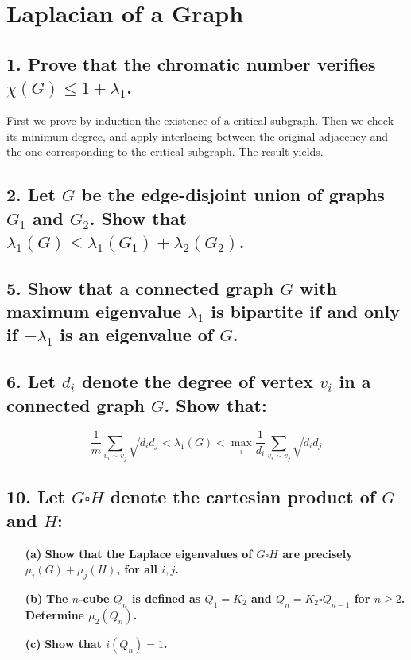 \section{Laplacian of a Graph}

\subsection[Laplacian - 1]{1. Prove that the chromatic number verifies $\chi(G) \leq 1 + \lambda_1$.}

First we prove by induction the existence of a critical subgraph.
Then we check its minimum degree, and apply interlacing between the original adjacency and the one corresponding to the critical subgraph.
The result yields.

\subsection[Laplacian - 2]{2. Let $G$ be the edge-disjoint union of graphs $G_1$ and $G_2$. Show that $\lambda_1(G) \leq \lambda_1(G_1) + \lambda_2(G_2)$.}

\subsection[Laplacian - 5]{5. Show that a connected graph $G$ with maximum eigenvalue $\lambda_1$ is bipartite if and only if $-\lambda_1$ is an eigenvalue of $G$.}

\subsection[Laplacian - 6]{6. Let $d_i$ denote the degree of vertex $v_i$ in a connected graph $G$. Show that:}
$$\frac{1}{m} \sum_{v_i \sim v_j} \sqrt{d_i d_j} < \lambda_1(G) < \max_i \frac{1}{d_i} \sum_{v_i \sim v_j} \sqrt{d_i d_j}$$

\subsection[Laplacian - 10]{10. Let $G \square H$ denote the cartesian product of $G$ and $H$:}

\begin{enumerate}
    \item[\textbf{(a)}] \textbf{Show that the Laplace eigenvalues of $G\square H$ are precisely $\mu_i(G) + \mu_j(H)$, for all $i, j$.}
    \item[\textbf{(b)}] \textbf{The $n$-cube $Q_n$ is defined as $Q_1 = K_2$ and $Q_n = K_2 \square Q_{n-1}$ for $n \geq 2$. Determine $\mu_2(Q_n)$.}
    \item[\textbf{(c)}] \textbf{Show that $i(Q_n) = 1$.}
\end{enumerate}

